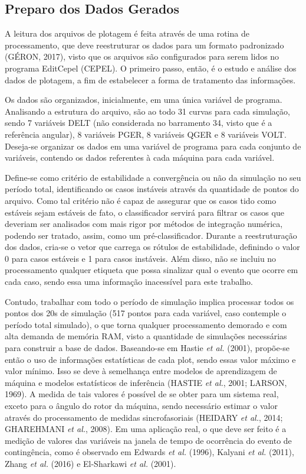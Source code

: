 \documentclass[12pt,oneside,a4paper,chapter=TITLE,section=TITLE,sumario=tradicional,english,brazil]{abntex2}
\begin{document}
\subsection{Preparo dos Dados Gerados}
A leitura dos arquivos de plotagem é feita através de uma rotina de processamento, que deve reestruturar os dados para um formato padronizado (GÉRON, 2017), visto que os arquivos são configurados para serem lidos no programa EditCepel (CEPEL). O primeiro passo, então, é o estudo e análise dos dados de plotagem, a fim de estabelecer a forma de tratamento das informações. 
\par
Os dados são organizados, inicialmente, em uma única variável de programa. Analisando a estrutura do arquivo, são ao todo 31 curvas para cada simulação, sendo 7 variáveis DELT (não considerada no barramento 34, visto que é a referência angular), 8 variáveis PGER, 8 variáveis QGER e 8 variáveis VOLT. Deseja-se organizar os dados em uma variável de programa para cada conjunto de variáveis, contendo os dados referentes à cada máquina para cada variável.
\par 
Define-se como critério de estabilidade a convergência ou não da simulação no seu período total, identificando os casos instáveis através da quantidade de pontos do arquivo. Como tal critério não é capaz de assegurar que os casos tido como estáveis sejam estáveis de fato, o classificador servirá para filtrar os casos que deveriam ser analisados com mais rigor por métodos de integração numérica, podendo ser tratado, assim, como um pré-classificador. Durante a reestruturação dos dados, cria-se o vetor que carrega os rótulos de estabilidade, definindo o valor 0 para casos estáveis e 1 para casos instáveis. Além disso, não se incluiu no processamento qualquer etiqueta que possa sinalizar qual o evento que ocorre em cada caso, sendo essa uma informação inacessível para este trabalho.
\par  
Contudo, trabalhar com todo o período de simulação implica processar todos os pontos dos 20s de simulação (517 pontos para cada variável, caso contemple o período total simulado), o que torna qualquer processamento demorado e com alta demanda de memória RAM, visto a quantidade de simulações necessárias para construir a base de dados. Baseando-se em Hastie \textit{et al.} (2001), propõe-se então o uso de informações estatísticas de cada plot, sendo essas valor máximo e valor mínimo. Isso se deve à semelhança entre modelos de aprendizagem de máquina e modelos estatísticos de inferência (HASTIE \textit{et al.}, 2001; LARSON, 1969). A medida de tais valores é possível de se obter para um sistema real, exceto para o ângulo do rotor da máquina, sendo necessário estimar o valor através do processamento de medidas sincrofasoriais (HEIDARY \textit{et al.}, 2014; GHAREHMANI \textit{et al.}, 2008). Em uma aplicação real, o que deve ser feito é a medição de valores das variáveis na janela de tempo de ocorrência do evento de contingência, como é observado em Edwards \textit{et al.} (1996), Kalyani \textit{et al.} (2011), Zhang \textit{et al.} (2016) e El-Sharkawi \textit{et al.} (2001).
\end{document}
